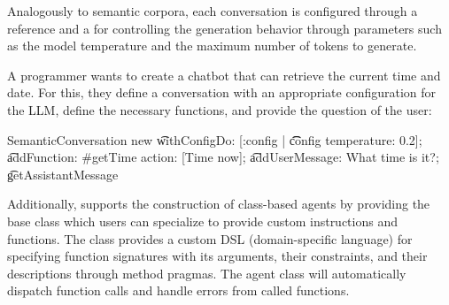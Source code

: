 Analogously to semantic corpora, each conversation is configured through a  reference and a  for controlling the generation behavior through parameters such as the model temperature and the maximum number of tokens to generate.

\begin{example}
	A programmer wants to create a chatbot that can retrieve the current time and date.
	For this, they define a conversation with an appropriate configuration for the LLM, define the necessary functions, and provide the question of the user:

	\begin{multicode}
		SemanticConversation new \n
		\t	withConfigDo: [:config | \n
		\t	\t	config temperature: 0.2]; \n
		\t	addFunction: \#getTime action: [Time now]; \n
		\t	addUserMessage: \textquotesingle What time is it?\textquotesingle; \n
		\t	getAssistantMessage 
	\end{multicode}
\end{example}

Additionally, \semtex supports the construction of class-based agents by providing the base class  which users can specialize to provide custom instructions and functions.
The  class provides a custom DSL (domain-specific language) for specifying function signatures with its arguments, their constraints, and their descriptions through method pragmas.
The agent class will automatically dispatch function calls and handle errors from called functions.

